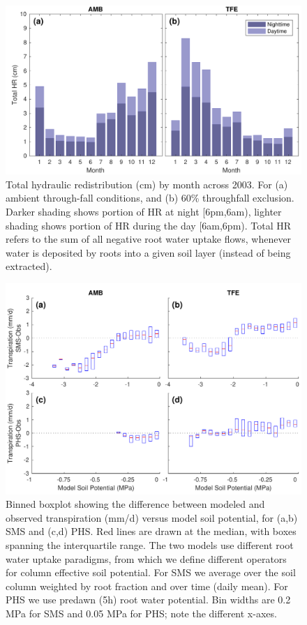 \documentclass[draft,linenumbers]{agujournal}
\begin{document}
    \clearpage
    \begin{figure}[h]
     \centering
     \includegraphics[width=30pc]{../figs3/hr.pdf}
     \caption{Total hydraulic redistribution (cm) by month across 2003. For (a) ambient through-fall conditions, and (b) 60\% throughfall exclusion. 
     Darker shading shows portion of HR at night [6pm,6am), lighter shading shows portion of HR during the day [6am,6pm).
     Total HR refers to the sum of all negative root water uptake flows, whenever water is deposited by roots into a given soil layer (instead of being extracted).}
     \label{fig:hr}
  \end{figure}

              \begin{figure}[h]
     \centering
     \includegraphics[width=30pc]{../figs3/sm3.pdf}
     \caption{Binned boxplot showing the difference between modeled and observed transpiration (mm/d) versus model soil potential, for (a,b) SMS and (c,d) PHS.
     Red lines are drawn at the median, with boxes spanning the interquartile range.
     The two models use different root water uptake paradigms, from which we define different operators for column effective soil potential.
     For SMS we average over the soil column weighted by root fraction and over time (daily mean).
     For PHS we use predawn (5h) root water potential.
     Bin widths are 0.2 MPa for SMS and 0.05 MPa for PHS; note the different x-axes. 
}
     \label{fig:cool}
  \end{figure}
          \clearpage
\end{document}
